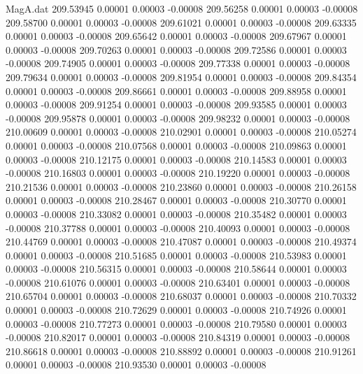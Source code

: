 \begin{filecontents}{MagA.dat}
 209.53945    0.00001    0.00003   -0.00008
 209.56258    0.00001    0.00003   -0.00008
 209.58700    0.00001    0.00003   -0.00008
 209.61021    0.00001    0.00003   -0.00008
 209.63335    0.00001    0.00003   -0.00008
 209.65642    0.00001    0.00003   -0.00008
 209.67967    0.00001    0.00003   -0.00008
 209.70263    0.00001    0.00003   -0.00008
 209.72586    0.00001    0.00003   -0.00008
 209.74905    0.00001    0.00003   -0.00008
 209.77338    0.00001    0.00003   -0.00008
 209.79634    0.00001    0.00003   -0.00008
 209.81954    0.00001    0.00003   -0.00008
 209.84354    0.00001    0.00003   -0.00008
 209.86661    0.00001    0.00003   -0.00008
 209.88958    0.00001    0.00003   -0.00008
 209.91254    0.00001    0.00003   -0.00008
 209.93585    0.00001    0.00003   -0.00008
 209.95878    0.00001    0.00003   -0.00008
 209.98232    0.00001    0.00003   -0.00008
 210.00609    0.00001    0.00003   -0.00008
 210.02901    0.00001    0.00003   -0.00008
 210.05274    0.00001    0.00003   -0.00008
 210.07568    0.00001    0.00003   -0.00008
 210.09863    0.00001    0.00003   -0.00008
 210.12175    0.00001    0.00003   -0.00008
 210.14583    0.00001    0.00003   -0.00008
 210.16803    0.00001    0.00003   -0.00008
 210.19220    0.00001    0.00003   -0.00008
 210.21536    0.00001    0.00003   -0.00008
 210.23860    0.00001    0.00003   -0.00008
 210.26158    0.00001    0.00003   -0.00008
 210.28467    0.00001    0.00003   -0.00008
 210.30770    0.00001    0.00003   -0.00008
 210.33082    0.00001    0.00003   -0.00008
 210.35482    0.00001    0.00003   -0.00008
 210.37788    0.00001    0.00003   -0.00008
 210.40093    0.00001    0.00003   -0.00008
 210.44769    0.00001    0.00003   -0.00008
 210.47087    0.00001    0.00003   -0.00008
 210.49374    0.00001    0.00003   -0.00008
 210.51685    0.00001    0.00003   -0.00008
 210.53983    0.00001    0.00003   -0.00008
 210.56315    0.00001    0.00003   -0.00008
 210.58644    0.00001    0.00003   -0.00008
 210.61076    0.00001    0.00003   -0.00008
 210.63401    0.00001    0.00003   -0.00008
 210.65704    0.00001    0.00003   -0.00008
 210.68037    0.00001    0.00003   -0.00008
 210.70332    0.00001    0.00003   -0.00008
 210.72629    0.00001    0.00003   -0.00008
 210.74926    0.00001    0.00003   -0.00008
 210.77273    0.00001    0.00003   -0.00008
 210.79580    0.00001    0.00003   -0.00008
 210.82017    0.00001    0.00003   -0.00008
 210.84319    0.00001    0.00003   -0.00008
 210.86618    0.00001    0.00003   -0.00008
 210.88892    0.00001    0.00003   -0.00008
 210.91261    0.00001    0.00003   -0.00008
 210.93530    0.00001    0.00003   -0.00008

\end{filecontents}
